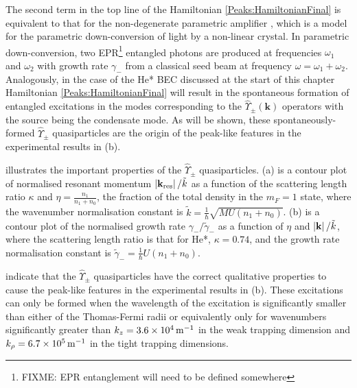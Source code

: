 The second term in the top line of the Hamiltonian \eqref{Peaks:HamiltonianFinal} is equivalent to that for the non-degenerate parametric amplifier \citep{WallsMilburn}, which is a model for the parametric down-conversion of light by a non-linear crystal. In parametric down-conversion, two EPR\footnote{FIXME: EPR entanglement will need to be defined somewhere} entangled photons are produced at frequencies $\omega_1$ and $\omega_2$ with growth rate $\gamma_-$ from a classical seed beam at frequency $\omega = \omega_1 + \omega_2$. Analogously, in the case of the He* BEC discussed at the start of this chapter Hamiltonian \eqref{Peaks:HamiltonianFinal} will result in the spontaneous formation of entangled excitations in the modes corresponding to the $\hat{\Upsilon}_\pm(\mathbf{k})$ operators with the source being the condensate mode. As will be shown, these spontaneously-formed $\hat{\Upsilon}_\pm$ quasiparticles are the origin of the peak-like features in the experimental results in (b). %


 illustrates the important properties of the $\hat{\Upsilon}_\pm$ quasiparticles. (a) is a contour plot of normalised resonant momentum $\left|\mathbf{k}_\text{res}\right|/\tilde{k}$ as a function of the scattering length ratio $\kappa$ and $\displaystyle\eta = \frac{n_1}{n_1 + n_0}$, the fraction of the total density in the $m_F=1$ state, where the wavenumber normalisation constant is $\tilde{k} = \frac{1}{\hbar}\sqrt{MU(n_1 + n_0)}$.  (b) is a contour plot of the normalised growth rate $\gamma_-/\tilde{\gamma}_-$ as a function of $\eta$ and $\left|\mathbf{k}\right|/\tilde{k}$, where the scattering length ratio is that for He*, $\kappa = 0.74$, and the growth rate normalisation constant is $\tilde{\gamma}_- = \frac{1}{\hbar}U(n_1+n_0)$.

 indicate that the $\hat{\Upsilon}_\pm$ quasiparticles have the correct qualitative properties to cause the peak-like features in the experimental results in (b). These excitations can only be formed when the wavelength of the excitation is significantly smaller than either of the Thomas-Fermi radii or equivalently only for wavenumbers significantly greater than $k_z=\unit[3.6\times 10^4]{m}^{-1}$ in the weak trapping dimension and $k_\rho=\unit[6.7\times 10^5]{m}^{-1}$ in the tight trapping dimensions. 



